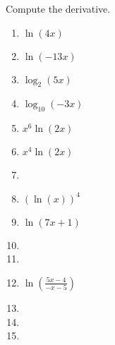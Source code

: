 Compute the derivative. 

\begin{multicols}{2}
\begin{enumerate}[ref={\fcProblemRef}]
\item $\displaystyle \ln(4x)$

\item $\displaystyle \ln(-13 x)$

\item  $\displaystyle\log_2(5 x)$

\item  $\displaystyle\log_{10}(-3 x)$

\item  $\displaystyle x^6\ln(2x)$

\item $\displaystyle x^{4} \ln\left(2 x\right)$

\item  
\item $\displaystyle (\ln{}\left({{x}}\right))^{4} $

\item $\displaystyle \ln{}\left(7 {{x}}+1\right)$

\item 
\item 
\item $\displaystyle \ln{}\left(\frac{5 {{x}}-4}{- {{x}}-5}\right) $

\item 
\item 
\item 
\end{enumerate}
\end{multicols}